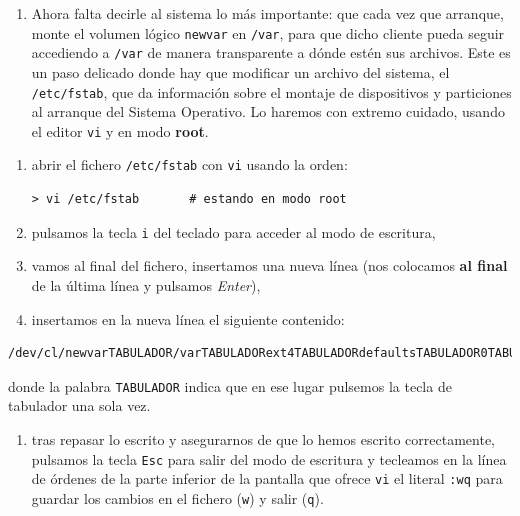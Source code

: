 \documentclass[
]{book}
\providecommand{\tightlist}{%
  \setlength{\itemsep}{0pt}\setlength{\parskip}{0pt}}
\begin{document}
\begin{enumerate}
\def\labelenumi{\arabic{enumi}.}
\setcounter{enumi}{11}
\tightlist
\item
  Ahora falta decirle al sistema lo más importante: que cada vez que arranque, monte el volumen lógico \texttt{newvar} en \texttt{/var}, para que dicho cliente pueda seguir accediendo a \texttt{/var} de manera transparente a dónde estén sus archivos. Este es un paso delicado donde hay que modificar un archivo del sistema, el \texttt{/etc/fstab}, que da información sobre el montaje de dispositivos y particiones al arranque del Sistema Operativo. Lo haremos con extremo cuidado, usando el editor \texttt{vi} y en modo \textbf{root}.
\end{enumerate}

\begin{enumerate}
\def\labelenumi{\roman{enumi}.}
\item
  abrir el fichero \texttt{/etc/fstab} con \texttt{vi} usando la orden:

\begin{verbatim}
> vi /etc/fstab       # estando en modo root
\end{verbatim}
\item
  pulsamos la tecla \texttt{i} del teclado para acceder al modo de escritura,
\item
  vamos al final del fichero, insertamos una nueva línea (nos colocamos \textbf{al final} de la última línea y pulsamos \emph{Enter}),
\item
  insertamos en la nueva línea el siguiente contenido:
\end{enumerate}

\begin{verbatim}
/dev/cl/newvarTABULADOR/varTABULADORext4TABULADORdefaultsTABULADOR0TABULADOR0
\end{verbatim}

donde la palabra \texttt{TABULADOR} indica que en ese lugar pulsemos la tecla de tabulador una sola vez.

\begin{enumerate}
\def\labelenumi{\alph{enumi}.}
\setcounter{enumi}{21}
\tightlist
\item
  tras repasar lo escrito y asegurarnos de que lo hemos escrito correctamente, pulsamos la tecla \texttt{Esc} para salir del modo de escritura y tecleamos en la línea de órdenes de la parte inferior de la pantalla que ofrece \texttt{vi} el literal \texttt{:wq} para guardar los cambios en el fichero (\texttt{w}) y salir (\texttt{q}).
\end{enumerate}
\end{document}

